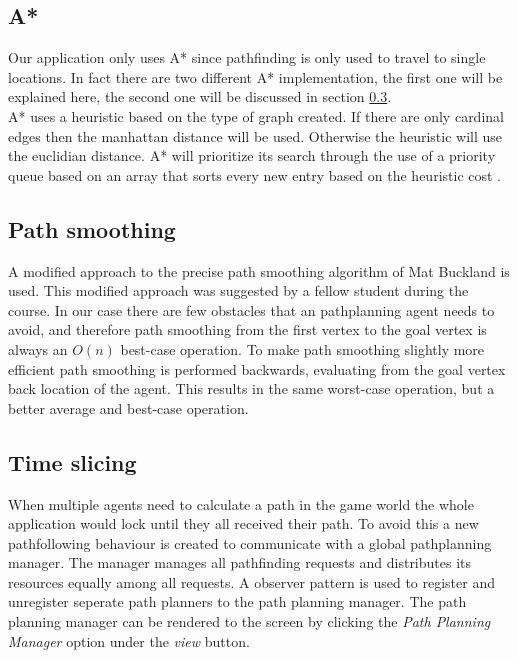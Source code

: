 \documentclass[10pt]{extarticle} %
\begin{document}
   \subsection {A*}
  Our application only uses A* since pathfinding is only used to travel to single locations. In fact there are two different A* implementation, the first one will be explained here, the second one will be discussed in section \ref{tsastar}.\\
  A* uses a heuristic based on the type of graph created. If there are only cardinal edges then the manhattan distance will be used. Otherwise the heuristic will use the euclidian distance. A* will prioritize its search through the use of a priority queue based on an array that sorts every new entry based on the heuristic cost \cite{shpq}. 
   \subsection {Path smoothing}
A modified approach to the precise path smoothing algorithm of Mat Buckland \cite{pgaie} is used. This modified approach was suggested by a fellow student during the course. In our case there are few obstacles that an pathplanning agent needs to avoid, and therefore path smoothing from the first vertex to the goal vertex is always an \(O(n)\) best-case operation. To make path smoothing slightly more efficient path smoothing is performed backwards, evaluating from the goal vertex back location of the agent. This results in the same worst-case operation, but a better average and best-case operation.
   \subsection {Time slicing} \label{tsastar}
  When multiple agents need to calculate a path in the game world the whole application would lock until they all received their path. To avoid this a new pathfollowing behaviour is created to communicate with a global pathplanning manager. The manager manages all pathfinding requests and distributes its resources equally among all requests. A observer pattern is used to register and unregister seperate path planners to the path planning manager.
   The path planning manager can be rendered to the screen by clicking the \emph{Path Planning Manager} option under the \emph{view} button.
   \newpage   
\end{document}
